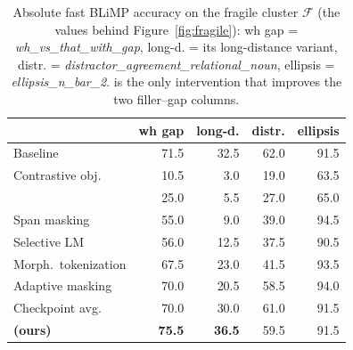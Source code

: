 \begin{table}[H]
  \centering
  \footnotesize
  \setlength{\tabcolsep}{3.5pt}
  \begin{tabular}{lrrrr}
    \toprule
    & \multicolumn{1}{c}{wh gap} & \multicolumn{1}{c}{long-d.} & \multicolumn{1}{c}{distr.} & \multicolumn{1}{c}{ellipsis} \\
    \midrule
    Baseline & 71.5 & 32.5 & 62.0 & 91.5 \\
    \midrule
    Contrastive obj. & 10.5 & 3.0 & 19.0 & 63.5 \\
    \Lmuon{} & 25.0 & 5.5 & 27.0 & 65.0 \\
    Span masking & 55.0 & 9.0 & 39.0 & 94.5 \\
    Selective LM & 56.0 & 12.5 & 37.5 & 90.5 \\
    Morph.\ tokenization & 67.5 & 23.0 & 41.5 & 93.5 \\
    Adaptive masking & 70.0 & 20.5 & 58.5 & 94.0 \\
    Checkpoint avg. & 70.0 & 30.0 & 61.0 & 91.5 \\
    \midrule
    \textbf{\MPO{} (ours)} & \textbf{75.5} & \textbf{36.5} & 59.5 & 91.5 \\
    \bottomrule
  \end{tabular}
  \caption{Absolute fast BLiMP accuracy on the fragile cluster
  $\mathcal{F}$ (the values behind Figure~\ref{fig:fragile}): {wh gap} =
  \emph{wh\_vs\_that\_with\_gap}, {long-d.} = its long-distance variant,
  {distr.} = \emph{distractor\_agreement\_relational\_noun}, {ellipsis} =
  \emph{ellipsis\_n\_bar\_2}. \MPO{} is the only intervention that improves
  the two filler--gap columns.}
  \label{tab:fragileabs}
\end{table}
